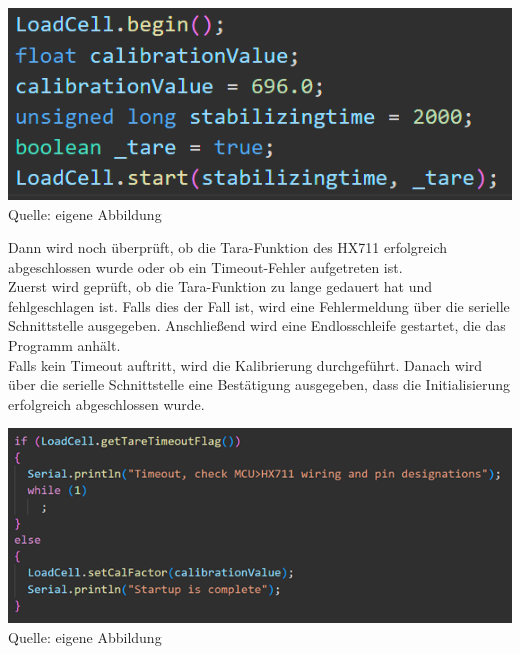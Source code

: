 \documentclass[ngerman,12pt,a4paper]{article}
\begin{document}
		\begin{center}
			\begin{minipage}{1\textwidth}
				\centering
				\includegraphics[width=\textwidth]{Pictures/code_hx711_setup}
				\label{fig:code_hx711_setup}
				\vspace{-3pt}
				{\small Quelle: {eigene Abbildung}}
			\end{minipage}
		\end{center}
		\vspace{8pt}
		Dann wird noch überprüft, ob die Tara-Funktion des HX711 erfolgreich abgeschlossen wurde oder ob ein Timeout-Fehler aufgetreten ist. \\ [0.3cm]
		Zuerst wird geprüft, ob die Tara-Funktion zu lange gedauert hat und fehlgeschlagen ist. Falls dies der Fall ist, wird eine Fehlermeldung über die serielle Schnittstelle ausgegeben. Anschließend wird eine Endlosschleife gestartet, die das Programm anhält. \\ [0.3cm]
		Falls kein Timeout auftritt, wird die Kalibrierung durchgeführt. Danach wird über die serielle Schnittstelle eine Bestätigung ausgegeben, dass die Initialisierung erfolgreich abgeschlossen wurde.
		\newpage
		\noindent
		\begin{center}
			\begin{minipage}{1\textwidth}
				\centering
				\includegraphics[width=\textwidth]{Pictures/code_hx711_timeout}
				\label{fig:code_hx711_timeout}
				\vspace{-3pt}
				{\small Quelle: {eigene Abbildung}}
			\end{minipage}
		\end{center}
\end{document}
